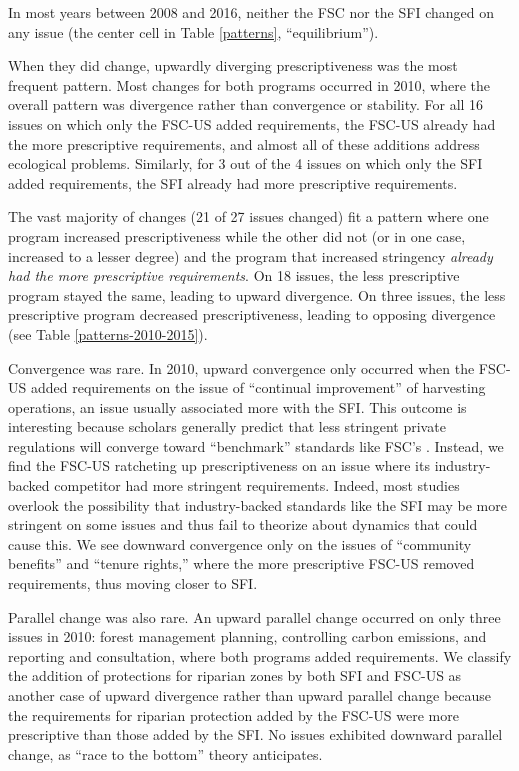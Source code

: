 \documentclass[
      12pt,
            Review ]{article}
\begin{document}
In most years between 2008 and 2016, neither the FSC nor the SFI changed on any issue (the center cell in Table \ref{patterns}, ``equilibrium'').

When they did change, upwardly diverging prescriptiveness was the most frequent pattern. Most changes for both programs occurred in 2010, where the overall pattern was divergence rather than convergence or stability. For all 16 issues on which only the FSC-US added requirements, the FSC-US already had the more prescriptive requirements, and almost all of these additions address ecological problems. Similarly, for 3 out of the 4 issues on which only the SFI added requirements, the SFI already had more prescriptive requirements.

The vast majority of changes (21 of 27 issues changed) fit a pattern where one program increased prescriptiveness while the other did not (or in one case, increased to a lesser degree) and the program that increased stringency \emph{already had the more prescriptive requirements}. On 18 issues, the less prescriptive program stayed the same, leading to upward divergence. On three issues, the less prescriptive program decreased prescriptiveness, leading to opposing divergence (see Table \ref{patterns-2010-2015}).



Convergence was rare. In 2010, upward convergence only occurred when the FSC-US added requirements on the issue of ``continual improvement'' of harvesting operations, an issue usually associated more with the SFI. This outcome is interesting because scholars generally predict that less stringent private regulations will converge toward ``benchmark'' standards like FSC's \citep{Overdevest2005, Overdevest2010}. Instead, we find the FSC-US ratcheting up prescriptiveness on an issue where its industry-backed competitor had more stringent requirements. Indeed, most studies overlook the possibility that industry-backed standards like the SFI may be more stringent on some issues and thus fail to theorize about dynamics that could cause this. We see downward convergence only on the issues of ``community benefits'' and ``tenure rights,'' where the more prescriptive FSC-US removed requirements, thus moving closer to SFI.

Parallel change was also rare. An upward parallel change occurred on only three issues in 2010: forest management planning, controlling carbon emissions, and reporting and consultation, where both programs added requirements. We classify the addition of protections for riparian zones by both SFI and FSC-US as another case of upward divergence rather than upward parallel change because the requirements for riparian protection added by the FSC-US were more prescriptive than those added by the SFI. No issues exhibited downward parallel change, as ``race to the bottom'' theory anticipates.
\end{document}
